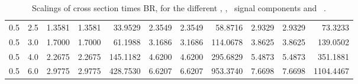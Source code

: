 \begin{landscape}
\begin{table}[h!]
\begin{tabular}{ll rrr rrr rrr}
   0.5 & 2.5    & 1.3581 & 1.3581 & 33.9529  & 2.3549 & 2.3549 & 58.8716   & 2.9329 & 2.9329 & 73.3233 \\
   0.5 & 3.0    & 1.7000 & 1.7000 & 61.1988  & 3.1686 & 3.1686 & 114.0678  & 3.8625 & 3.8625 & 139.0502 \\
   0.5 & 4.0    & 2.2675 & 2.2675 & 145.1182 & 4.6200 & 4.6200 & 295.6829  & 5.4873 & 5.4873 & 351.1881 \\
   0.5 & 6.0    & 2.9775 & 2.9775 & 428.7530 & 6.6207 & 6.6207 & 953.3740  & 7.6698 & 7.6698 & 1104.4467 \\\hline
  \end{tabular}
  \caption[Scalings of $\sigma\times$BR for the signal components and \ ]{Scalings of cross section times BR, for the different \ttH, \tHq, \tHW\ signal components and \ .}\label{tab:xsbrscalingK6_0p5}
\end{table}


\end{landscape}

